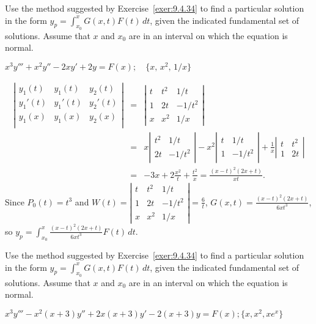 \documentclass{ximera}
\begin{document}
\begin{problem}\label{exer:9.4.36}
Use the method suggested by Exercise~\ref{exer:9.4.34} to find a particular solution in the form
$y_p=\int_{x_0}^x G(x,t)F(t)\,dt$, given the indicated fundamental set of solutions.  Assume that $x$ and $x_0$ are in an interval on which
the equation is normal.

$x^3y'''+x^2y''-2xy'+2y=F(x); \quad \{x,\,x^2,\,1/x\}$

\begin{solution}
\begin{eqnarray*}
\left|\begin{array}{ccc}
y_1(t)&y_1(t)&y_2(t)\\
y_1'(t)&y_1'(t)&y_2'(t)\\
y_1(x)&y_1(x)&y_2(x)\\
\end{array}\right| &=&
\left|\begin{array}{cccc}
t&t^2&1/t\\
1&2t&-1/t^2\\
x&x^2&1/x
\end{array}\right|\\
&=&
x\left|\begin{array}{cccc}t^2&1/t\\2t&-1/t^2\end{array}\right|
-x^2\left|\begin{array}{cccc}t&1/t\\1&-1/t^2\end{array}\right|
+\frac{1}{x}\left|\begin{array}{cccc}t&t^2\\1&2t\end{array}\right|\\
&=&-3x+2\frac{x^2}{t}+\frac{t^2}{x}=\frac{(x-t)^2(2x+t)}{xt}.
\end{eqnarray*}
Since $P_0(t)=t^3$ and
$W(t)=\left|\begin{array}{ccc}
t&t^2&1/t\\
1&2t&-1/t^2\\
x&x^2&1/x
\end{array}\right|=\frac{6}{t}$,
$G(x,t)=\frac{(x-t)^2(2x+t)}{6xt^3}$,
so
$y_p={\int_{x_0}^x \frac{(x-t)^2(2x+t)}{6xt^3}
F(t)\,dt}$.
\end{solution}
\end{problem}

\begin{problem}\label{exer:9.4.37}
Use the method suggested by Exercise~\ref{exer:9.4.34} to find a particular solution in the form
$y_p=\int_{x_0}^x G(x,t)F(t)\,dt$, given the indicated fundamental set of solutions.  Assume that $x$ and $x_0$ are in an interval on which
the equation is normal.

$x^3y'''-x^2(x+3)y''+2x(x+3)y'-2(x+3)y=F(x); \{x,x^2,xe^x\}$
\end{problem}
\end{document}
